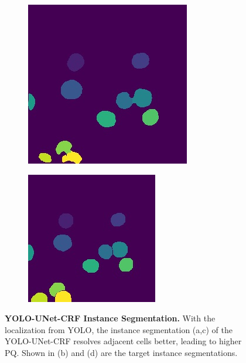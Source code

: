 \documentclass[10pt, journal, compsoc]{IEEEtran}
\begin{document}
\begin{figure}
\begin{subfigure}[b]{0.49\linewidth}
\caption{}
\end{subfigure}
\begin{subfigure}[b]{0.49\linewidth}
\includegraphics[width=\linewidth]{yolounetcrf/108641-yolounetcrf.jpg}
\caption{}
\end{subfigure}
\begin{subfigure}[b]{0.49\linewidth}
\includegraphics[width=\linewidth]{yolounetcrf/108641-label.jpg}
\caption{}
\end{subfigure}
\caption{\textbf{YOLO-UNet-CRF Instance Segmentation.} With the localization from YOLO, the instance segmentation (a,c) of the YOLO-UNet-CRF resolves adjacent cells better, leading to higher PQ. Shown in (b) and (d) are the target instance segmentations.}
\label{fig:yolounetcrf_results}
\end{figure}
\end{document}

